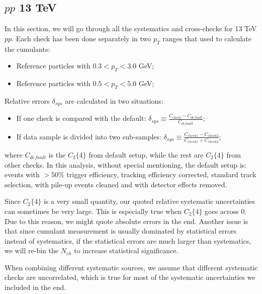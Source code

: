 \subsection{$pp$ 13 TeV}
In this section, we will go through all the systematics and cross-checks for 13 TeV $pp$. Each check has been done separately in two $p_{T}$ ranges that used to calculate the cumulants:
\begin{itemize}
\item Reference particles with $0.3<p_{T}<3.0$ GeV;
\item Reference particles with $0.5<p_{T}<5.0$ GeV;
\end{itemize}

Relative errors $\delta_{sys}$ are calculated in two situations:
\begin{itemize}
\item If one check is compared with the default: $\delta_{sys}\equiv \frac{C_{check}-C_{default}}{C_{default}}$;
\item If data sample is divided into two sub-samples: $\delta_{sys}\equiv \frac{C_{check1}-C_{check2}}{C_{check1}+C_{check2}}$;
\end{itemize}
where $C_{default}$ is the $C_{2}\{4\}$ from default setup, while the rest are $C_{2}\{4\}$ from other checks. In this analysis, without special mentioning, the default setup is: events with $>50\%$ trigger efficiency, tracking efficiency corrected, standard track selection, with pile-up events cleaned and with detector effects removed.

Since $C_{2}\{4\}$ is a very small quantity, our quoted relative systematic uncertainties can sometimes be very large. This is especially true when $C_{2}\{4\}$ goes across 0. Due to this reason, we might quote absolute errors in the end. Another issue is that since cumulant measurement is usually dominated by statistical errors instead of systematics, if the statistical errors are much larger than systematics, we will re-bin the $N_{ch}$ to increase statistical significance.

When combining different systematic sources, we assume that different systematic checks are uncorrelated, which is true for most of the systematic uncertainties we included in the end.



